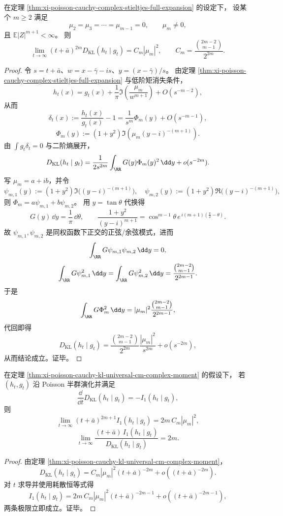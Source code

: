 \begin{theorem}\label{thm:xi-poisson-cauchy-kl-universal-cm-complex-moment}
在定理 \ref{thm:xi-poisson-cauchy-complex-stieltjes-full-expansion} 的设定下，
设某个 \(m\ge 2\) 满足
\[
\mu_2=\mu_3=\cdots=\mu_{m-1}=0,\qquad \mu_m\neq 0,
\]
且 \(\mathbb E|Z|^{m+1}<\infty\)。
则
\[
\lim_{t\to\infty}(t+\bar a)^{2m}D_{\mathrm{KL}}(h_t\mid g_t)
=C_m|\mu_m|^2,
\qquad
C_m=\frac{\binom{2m-2}{m-1}}{2^{2m}}.
\]
\end{theorem}
\begin{proof}
令 \(s=t+\bar a\)、\(w=x-\bar\gamma-is\)、\(y=(x-\bar\gamma)/s\)。
由定理 \ref{thm:xi-poisson-cauchy-complex-stieltjes-full-expansion} 与低阶矩消失条件，
\[
h_t(x)=g_t(x)+\frac1\pi\Im\!\left(\frac{\mu_m}{w^{m+1}}\right)+O(s^{-m-2}),
\]
从而
\[
\delta_t(x):=\frac{h_t(x)}{g_t(x)}-1
=\frac{1}{s^m}\Phi_m(y)+O(s^{-m-1}),
\]
\[
\Phi_m(y):=(1+y^2)\Im\!\left(\mu_m(y-i)^{-(m+1)}\right).
\]
由 \(\int g_t\delta_t=0\) 与二阶熵展开，
\[
D_{\mathrm{KL}}(h_t\mid g_t)
=\frac{1}{2s^{2m}}\int_{\RR}G(y)\Phi_m(y)^2\,\dd y+o(s^{-2m}).
\]
写 \(\mu_m=a+ib\)，并令
\[
\psi_{m,1}(y):=(1+y^2)\Im\!\big((y-i)^{-(m+1)}\big),\quad
\psi_{m,2}(y):=(1+y^2)\Re\!\big((y-i)^{-(m+1)}\big),
\]
则 \(\Phi_m=a\psi_{m,1}+b\psi_{m,2}\)。
用 \(y=\tan\theta\) 代换得
\[
G(y)\,\dd y=\frac{1}{\pi}\,\dd\theta,\qquad
\frac{1+y^2}{(y-i)^{m+1}}
=\cos^{m-1}\theta\,e^{\,i(m+1)\left(\frac{\pi}{2}-\theta\right)}.
\]
故 \(\psi_{m,1},\psi_{m,2}\) 是同权函数下正交的正弦/余弦模式，进而
\[
\int_{\RR}G\psi_{m,1}\psi_{m,2}\,\dd y=0,
\]
\[
\int_{\RR}G\psi_{m,1}^2\,\dd y
=\int_{\RR}G\psi_{m,2}^2\,\dd y
=\frac{\binom{2m-2}{m-1}}{2^{2m-1}}.
\]
于是
\[
\int_{\RR}G\Phi_m^2\,\dd y
=|\mu_m|^2\frac{\binom{2m-2}{m-1}}{2^{2m-1}},
\]
代回即得
\[
D_{\mathrm{KL}}(h_t\mid g_t)
=\frac{\binom{2m-2}{m-1}}{2^{2m}}\frac{|\mu_m|^2}{s^{2m}}+o(s^{-2m}),
\]
从而结论成立。证毕。
\end{proof}

\begin{corollary}[耗散阶与多极阶的严格对齐]\label{cor:xi-poisson-cauchy-i1-over-kl-ratio-2m}
在定理 \ref{thm:xi-poisson-cauchy-kl-universal-cm-complex-moment} 的假设下，
若 \((h_t,g_t)\) 沿 Poisson 半群演化并满足
\[
\frac{\dd}{\dd t}D_{\mathrm{KL}}(h_t\mid g_t)=-I_1(h_t\mid g_t),
\]
则
\[
\lim_{t\to\infty}(t+\bar a)^{2m+1}I_1(h_t\mid g_t)
=2m\,C_m|\mu_m|^2,
\]
\[
\lim_{t\to\infty}\frac{(t+\bar a)\,I_1(h_t\mid g_t)}{D_{\mathrm{KL}}(h_t\mid g_t)}=2m.
\]
\end{corollary}
\begin{proof}
由定理 \ref{thm:xi-poisson-cauchy-kl-universal-cm-complex-moment}，
\[
D_{\mathrm{KL}}(h_t\mid g_t)
=C_m|\mu_m|^2(t+\bar a)^{-2m}+o((t+\bar a)^{-2m}).
\]
对 \(t\) 求导并使用耗散恒等式得
\[
I_1(h_t\mid g_t)
=2m\,C_m|\mu_m|^2(t+\bar a)^{-2m-1}+o((t+\bar a)^{-2m-1}),
\]
两条极限立即成立。证毕。
\end{proof}

